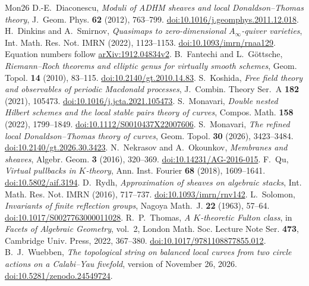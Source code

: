 \begin{thebibliography}{Mon26}
 D.-E.~Diaconescu, \emph{Moduli of ADHM sheaves and local Donaldson--Thomas theory}, J.~Geom. Phys. \textbf{62} (2012), 763--799. \href{https://doi.org/10.1016/j.geomphys.2011.12.018}{doi:10.1016/j.geomphys.2011.12.018}.
 H.~Dinkins and A.~Smirnov, \emph{Quasimaps to zero-dimensional $A_\infty$-quiver varieties}, Int. Math. Res. Not. IMRN (2022), 1123--1153. \href{https://doi.org/10.1093/imrn/rnaa129}{doi:10.1093/imrn/rnaa129}. Equation numbers follow \href{https://arxiv.org/abs/1912.04834v2}{arXiv:1912.04834v2}.
 B.~Fantechi and L.~G\"ottsche, \emph{Riemann--Roch theorems and elliptic genus for virtually smooth schemes}, Geom. Topol. \textbf{14} (2010), 83--115. \href{https://doi.org/10.2140/gt.2010.14.83}{doi:10.2140/gt.2010.14.83}.
 S.~Koshida, \emph{Free field theory and observables of periodic Macdonald processes}, J.~Combin. Theory Ser.~A \textbf{182} (2021), 105473. \href{https://doi.org/10.1016/j.jcta.2021.105473}{doi:10.1016/j.jcta.2021.105473}.
 S.~Monavari, \emph{Double nested Hilbert schemes and the local stable pairs theory of curves}, Compos. Math. \textbf{158} (2022), 1799--1849. \href{https://doi.org/10.1112/S0010437X22007606}{doi:10.1112/S0010437X22007606}.
 S.~Monavari, \emph{The refined local Donaldson--Thomas theory of curves}, Geom. Topol. \textbf{30} (2026), 3423--3484. \href{https://doi.org/10.2140/gt.2026.30.3423}{doi:10.2140/gt.2026.30.3423}.
 N.~Nekrasov and A.~Okounkov, \emph{Membranes and sheaves}, Algebr. Geom. \textbf{3} (2016), 320--369. \href{https://doi.org/10.14231/AG-2016-015}{doi:10.14231/AG-2016-015}.
 F.~Qu, \emph{Virtual pullbacks in $K$-theory}, Ann. Inst. Fourier \textbf{68} (2018), 1609--1641. \href{https://doi.org/10.5802/aif.3194}{doi:10.5802/aif.3194}.
 D.~Rydh, \emph{Approximation of sheaves on algebraic stacks}, Int. Math. Res. Not. IMRN (2016), 717--737. \href{https://doi.org/10.1093/imrn/rnv142}{doi:10.1093/imrn/rnv142}.
 L.~Solomon, \emph{Invariants of finite reflection groups}, Nagoya Math.~J. \textbf{22} (1963), 57--64. \href{https://doi.org/10.1017/S0027763000011028}{doi:10.1017/S0027763000011028}.
 R.~P.~Thomas, \emph{A $K$-theoretic Fulton class}, in \emph{Facets of Algebraic Geometry}, vol.~2, London Math. Soc. Lecture Note Ser. \textbf{473}, Cambridge Univ. Press, 2022, 367--380. \href{https://doi.org/10.1017/9781108877855.012}{doi:10.1017/9781108877855.012}.
 B.~J.~Wuebben, \emph{The topological string on balanced local curves from two circle actions on a Calabi--Yau fivefold}, version of November 26, 2026. \href{https://doi.org/10.5281/zenodo.24549724}{doi:10.5281/zenodo.24549724}.
\end{thebibliography}
